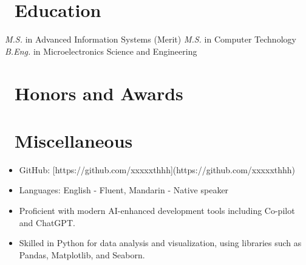 \documentclass{resume}
\begin{document}
\section{\faGraduationCap\ Education}
\textit{M.S.} in Advanced Information Systems (Merit)
\textit{M.S.} in Computer Technology
\textit{B.Eng.} in Microelectronics Science and Engineering

\section{\faHeartO\ Honors and Awards}

\section{\faInfo\ Miscellaneous}
\begin{itemize}[parsep=0.5ex]
  \item GitHub: [https://github.com/xxxxxthhh](https://github.com/xxxxxthhh)
  \item Languages: English - Fluent, Mandarin - Native speaker
  \item Proficient with modern AI-enhanced development tools including Co-pilot and ChatGPT.
  \item Skilled in Python for data analysis and visualization, using libraries such as Pandas, Matplotlib, and Seaborn.
\end{itemize}
\end{document}

